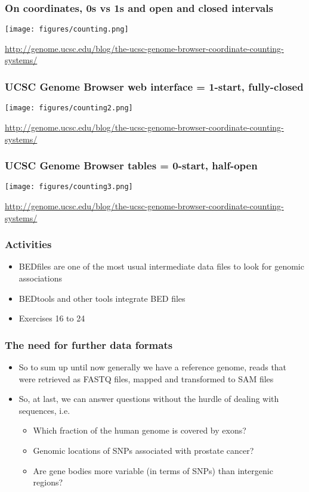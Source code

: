 \documentclass{beamer}
\begin{document}
\begin{frame}
  \frametitle{On coordinates, 0s vs 1s and open and closed intervals}
    \centering   
    \texttt{[image: figures/counting.png]}

 {\tiny \url{http://genome.ucsc.edu/blog/the-ucsc-genome-browser-coordinate-counting-systems/}}
\end{frame}


\begin{frame}
  \frametitle{UCSC Genome Browser web interface = 1-start, fully-closed}

    \centering   
    \texttt{[image: figures/counting2.png]}

 {\tiny \url{http://genome.ucsc.edu/blog/the-ucsc-genome-browser-coordinate-counting-systems/}}

\end{frame}

\begin{frame}
  \frametitle{UCSC Genome Browser tables = 0-start, half-open}

    \centering   
    \texttt{[image: figures/counting3.png]}

 {\tiny \url{http://genome.ucsc.edu/blog/the-ucsc-genome-browser-coordinate-counting-systems/}}

\end{frame}

\begin{frame}
  \frametitle{Activities}
  \begin{itemize}
  \item BEDfiles are one of the most usual intermediate data files to look for genomic associations
  \item BEDtools and other tools integrate BED files
  \item Exercises 16 to 24
  \end{itemize}
\end{frame}


\begin{frame}
  \frametitle{The need for further data formats}
  \begin{itemize}
  \item So to sum up until now generally we have a reference genome, reads that were retrieved as FASTQ files, mapped and transformed to SAM files 
  \item So, at last, we can answer questions without the hurdle of dealing with sequences, i.e.
    \begin{itemize}
    \item Which fraction of the human genome is covered by exons? 
    \item Genomic locations of SNPs associated with prostate cancer?
    \item Are gene bodies more variable (in terms of SNPs) than intergenic regions?
    \end{itemize}
  \end{itemize}
\end{frame}
\end{document}
